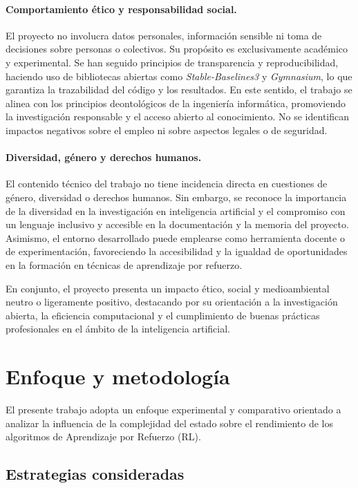 \paragraph{Comportamiento ético y responsabilidad social.}
El proyecto no involucra datos personales, información sensible ni toma de decisiones sobre personas o colectivos. Su propósito es exclusivamente académico y experimental. Se han seguido principios de transparencia y reproducibilidad, haciendo uso de bibliotecas abiertas como \textit{Stable-Baselines3} y \textit{Gymnasium}, lo que garantiza la trazabilidad del código y los resultados. En este sentido, el trabajo se alinea con los principios deontológicos de la ingeniería informática, promoviendo la investigación responsable y el acceso abierto al conocimiento. No se identifican impactos negativos sobre el empleo ni sobre aspectos legales o de seguridad.

\paragraph{Diversidad, género y derechos humanos.}
El contenido técnico del trabajo no tiene incidencia directa en cuestiones de género, diversidad o derechos humanos. Sin embargo, se reconoce la importancia de la diversidad en la investigación en inteligencia artificial y el compromiso con un lenguaje inclusivo y accesible en la documentación y la memoria del proyecto. Asimismo, el entorno desarrollado puede emplearse como herramienta docente o de experimentación, favoreciendo la accesibilidad y la igualdad de oportunidades en la formación en técnicas de aprendizaje por refuerzo.

En conjunto, el proyecto presenta un impacto ético, social y medioambiental neutro o ligeramente positivo, destacando por su orientación a la investigación abierta, la eficiencia computacional y el cumplimiento de buenas prácticas profesionales en el ámbito de la inteligencia artificial.


\section{Enfoque y metodología}

El presente trabajo adopta un enfoque experimental y comparativo orientado a analizar la influencia de la complejidad del estado sobre el rendimiento de los algoritmos de Aprendizaje por Refuerzo (RL).

\subsection{Estrategias consideradas}

